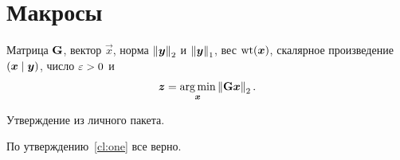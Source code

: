 \documentclass[12pt]{article}
\begin{document}
\section{Макросы}

Матрица $\matr{G}$, вектор $\vec{x}$, норма $\norm{\vect{y}}$ и $\norm[1]{\vect{y}}$,
вес $\wt(\vect{x})$, скалярное произведение $\inner{\vect{x}}{\vect{y}}$,
число $\eps > 0$ и
\begin{equation}
  \vect{z} = \argmin_{\vect{x}} \norm{\matr{G}\vect{x}}.
\end{equation}

\begin{claim}\label{cl:one}
Утверждение из личного пакета.
\end{claim}

По утверждению~\ref{cl:one} все верно.
\end{document}

